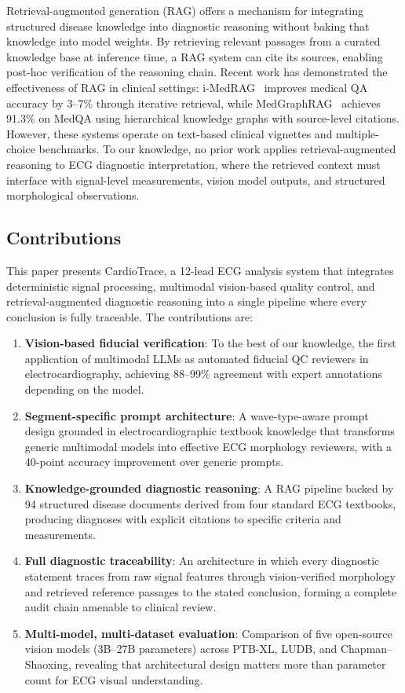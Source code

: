 \documentclass[journal,compsoc]{IEEEtran}
\newcommand{\system}{CardioTrace}
\begin{document}
Retrieval-augmented generation (RAG) offers a mechanism for integrating structured disease knowledge into diagnostic reasoning without baking that knowledge into model weights. By retrieving relevant passages from a curated knowledge base at inference time, a RAG system can cite its sources, enabling post-hoc verification of the reasoning chain. Recent work has demonstrated the effectiveness of RAG in clinical settings: i-MedRAG~\cite{imedrag2025} improves medical QA accuracy by 3--7\% through iterative retrieval, while MedGraphRAG~\cite{medgraphrag2025} achieves 91.3\% on MedQA using hierarchical knowledge graphs with source-level citations. However, these systems operate on text-based clinical vignettes and multiple-choice benchmarks. To our knowledge, no prior work applies retrieval-augmented reasoning to ECG diagnostic interpretation, where the retrieved context must interface with signal-level measurements, vision model outputs, and structured morphological observations.

\subsection{Contributions}

This paper presents \system{}, a 12-lead ECG analysis system that integrates deterministic signal processing, multimodal vision-based quality control, and retrieval-augmented diagnostic reasoning into a single pipeline where every conclusion is fully traceable. The contributions are:

\begin{enumerate}[leftmargin=*]
\item \textbf{Vision-based fiducial verification}: To the best of our knowledge, the first application of multimodal LLMs as automated fiducial QC reviewers in electrocardiography, achieving 88--99\% agreement with expert annotations depending on the model.
\item \textbf{Segment-specific prompt architecture}: A wave-type-aware prompt design grounded in electrocardiographic textbook knowledge that transforms generic multimodal models into effective ECG morphology reviewers, with a 40-point accuracy improvement over generic prompts.
\item \textbf{Knowledge-grounded diagnostic reasoning}: A RAG pipeline backed by 94 structured disease documents derived from four standard ECG textbooks, producing diagnoses with explicit citations to specific criteria and measurements.
\item \textbf{Full diagnostic traceability}: An architecture in which every diagnostic statement traces from raw signal features through vision-verified morphology and retrieved reference passages to the stated conclusion, forming a complete audit chain amenable to clinical review.
\item \textbf{Multi-model, multi-dataset evaluation}: Comparison of five open-source vision models (3B--27B parameters) across PTB-XL, LUDB, and Chapman--Shaoxing, revealing that architectural design matters more than parameter count for ECG visual understanding.
\end{enumerate}
\end{document}
